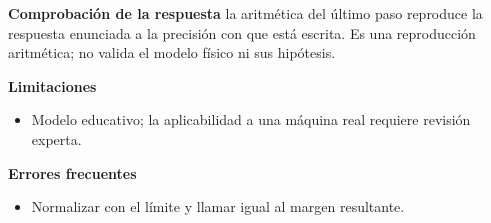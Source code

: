 \documentclass[10pt,openany]{book}
\begin{document}
\begin{tcolorbox}[title={Problema resuelto 2}, studiumworked, breakable]
\noindent\textbf{Comprobación de la respuesta} la aritmética del último paso reproduce la respuesta enunciada a la precisión con que está escrita. Es una reproducción aritmética; no valida el modelo físico ni sus hipótesis.

\noindent\textbf{Limitaciones}
\begin{itemize}
\item Modelo educativo; la aplicabilidad a una máquina real requiere revisión experta.
\end{itemize}

\noindent\textbf{Errores frecuentes}
\begin{itemize}
\item Normalizar con el límite y llamar igual al margen resultante.
\end{itemize}
\end{tcolorbox}
\end{document}
